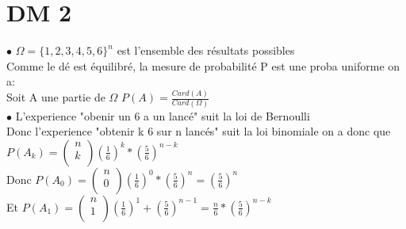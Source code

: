\documentclass{article}
\author{Frederic Becerril}
\begin{document}
\part*{DM 2}

$\bullet$ $\Omega = \{1, 2, 3, 4, 5, 6\}^n$ est l'ensemble des résultats possibles\\
Comme le dé est équilibré, la mesure de probabilité P est une proba uniforme on a:\\
Soit A une partie de $\Omega$ $P(A) = \frac{Card(A)}{Card(\Omega)}$\\
$\bullet$ L'experience "obenir un 6 a un lancé" suit la loi de Bernoulli\\
Donc l'experience "obtenir k 6 sur n lancés" suit la loi binomiale on a donc que\\
$P(A_k) = \begin{pmatrix}
    n\\
    k\\
\end{pmatrix} (\frac{1}{6})^k * (\frac{5}{6})^{n - k}$\\
Donc $P(A_0) = \begin{pmatrix}
    n\\
    0\\
\end{pmatrix} (\frac{1}{6})^0 * (\frac{5}{6})^{n} = (\frac{5}{6})^{n}$\\
Et $P(A_1) = \begin{pmatrix}
    n\\
    1\\
\end{pmatrix} (\frac{1}{6})^1 + (\frac{5}{6})^{n - 1} = \frac{n}{6} * (\frac{5}{6})^{n - k}$\\
\end{document}
